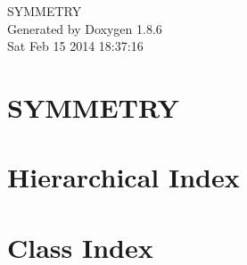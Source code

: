 \documentclass[twoside]{book}
\newcommand{\clearemptydoublepage}{%
  \newpage{\pagestyle{empty}\cleardoublepage}%
}
\begin{document}
\hypersetup{pageanchor=false}
\begin{titlepage}
\vspace*{7cm}
\begin{center}%
{\Large S\-Y\-M\-M\-E\-T\-R\-Y }\\
\vspace*{1cm}
{\large Generated by Doxygen 1.8.6}\\
\vspace*{0.5cm}
{\small Sat Feb 15 2014 18:37:16}\\
\end{center}
\end{titlepage}
\clearemptydoublepage
\tableofcontents
\clearemptydoublepage
{}
\hypersetup{pageanchor=true}

\chapter{S\-Y\-M\-M\-E\-T\-R\-Y}
\label{index}\hypertarget{index}{}
\chapter{Hierarchical Index}

\chapter{Class Index}

\end{document}
